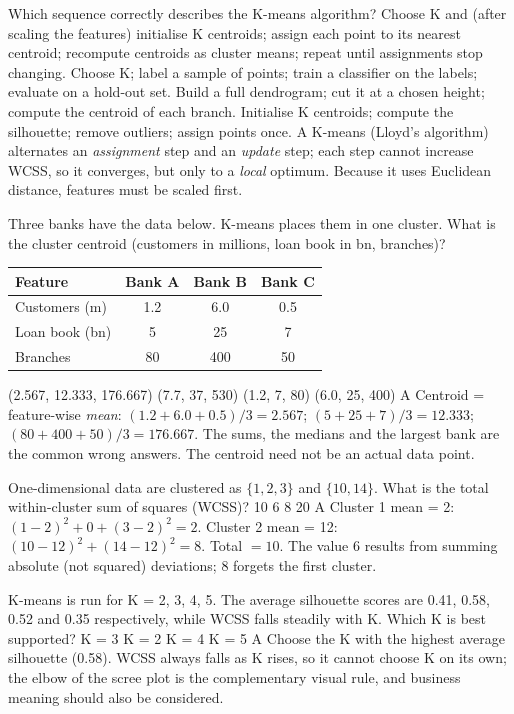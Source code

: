 {Which sequence correctly describes the K-means algorithm?}
{Choose K and (after scaling the features) initialise K centroids; assign each point to its nearest centroid; recompute centroids as cluster means; repeat until assignments stop changing.}
{Choose K; label a sample of points; train a classifier on the labels; evaluate on a hold-out set.}
{Build a full dendrogram; cut it at a chosen height; compute the centroid of each branch.}
{Initialise K centroids; compute the silhouette; remove outliers; assign points once.}
{A}
{K-means (Lloyd's algorithm) alternates an \emph{assignment} step and an \emph{update} step; each step cannot increase WCSS, so it converges, but only to a \emph{local} optimum. Because it uses Euclidean distance, features must be scaled first.}

{Three banks have the data below. K-means places them in one cluster. What is the cluster centroid (customers in millions, loan book in bn, branches)?
	\begin{center}\small
		\begin{tabular}{@{}lccc@{}}
			\toprule
			Feature & Bank A & Bank B & Bank C \\
			\midrule
			Customers (m) & 1.2 & 6.0 & 0.5 \\
			Loan book (bn) & 5 & 25 & 7 \\
			Branches & 80 & 400 & 50 \\
			\bottomrule
\end{tabular}\end{center}}
{(2.567, 12.333, 176.667)}
{(7.7, 37, 530)}
{(1.2, 7, 80)}
{(6.0, 25, 400)}
{A}
{Centroid = feature-wise \emph{mean}: $(1.2+6.0+0.5)/3=2.567$; $(5+25+7)/3=12.333$; $(80+400+50)/3=176.667$. The sums, the medians and the largest bank are the common wrong answers. The centroid need not be an actual data point.}

{One-dimensional data are clustered as $\{1,2,3\}$ and $\{10,14\}$. What is the total within-cluster sum of squares (WCSS)?}
{10}
{6}
{8}
{20}
{A}
{Cluster 1 mean = 2: $(1-2)^2+0+(3-2)^2=2$. Cluster 2 mean = 12: $(10-12)^2+(14-12)^2=8$. Total $=10$. The value 6 results from summing absolute (not squared) deviations; 8 forgets the first cluster.}

{K-means is run for K = 2, 3, 4, 5. The average silhouette scores are 0.41, 0.58, 0.52 and 0.35 respectively, while WCSS falls steadily with K. Which K is best supported?}
{K = 3}
{K = 2}
{K = 4}
{K = 5}
{A}
{Choose the K with the highest average silhouette (0.58). WCSS always falls as K rises, so it cannot choose K on its own; the elbow of the scree plot is the complementary visual rule, and business meaning should also be considered.}

